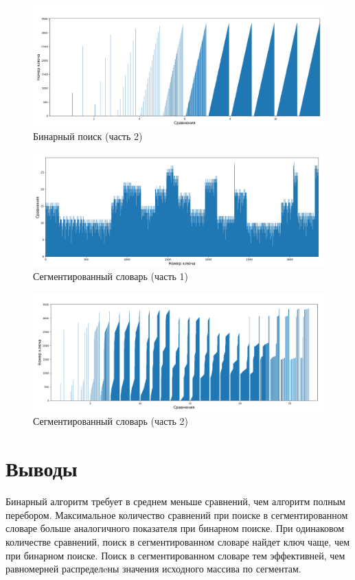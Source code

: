 \documentclass[a4paper,oneside,14pt]{extreport}
\begin{document}
\begin{figure}[H]
	\includegraphics[scale = 0.3]{images/bin_comp.png}
	\centering
	\caption{Бинарный поиск (часть 2)}
	\label{fig:bin_comp}
\end{figure}

\begin{figure}[H]
	\centering
	\includegraphics[scale = 0.3]{images/seg_keys.png}
	\caption{Сегментированный словарь (часть 1)}
	\label{fig:seg_keys}
\end{figure}

\begin{figure}[H]
	\includegraphics[scale = 0.3]{images/seg_comp.png}
	\centering
	\caption{Сегментированный словарь (часть 2)}
	\label{fig:seg_comp}
\end{figure}

\section{Выводы}
Бинарный алгоритм требует в среднем меньше сравнений, чем алгоритм полным перебором. Максимальное количество сравнений при поиске в сегментированном словаре больше аналогичного показателя при бинарном поиске. При одинаковом количестве сравнений, поиск в сегментированном словаре найдет ключ чаще, чем при бинарном поиске. Поиск в сегментированном словаре тем эффективней, чем равномерней распределeны значения исходного массива по сегментам.
\newpage
\end{document}
